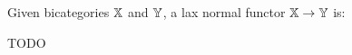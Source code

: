 %
%
%
%
%
%
%
%
%
%
%
%
%
%
%
%
%
%
%
%
%
%
%
%
%
%
%
%
%
%
%











\begin{definition}
Given bicategories $\mathbb{X}$ and $\mathbb{Y}$, a lax normal functor $\mathbb{X}\to\mathbb{Y}$ is:

TODO
\end{definition}


